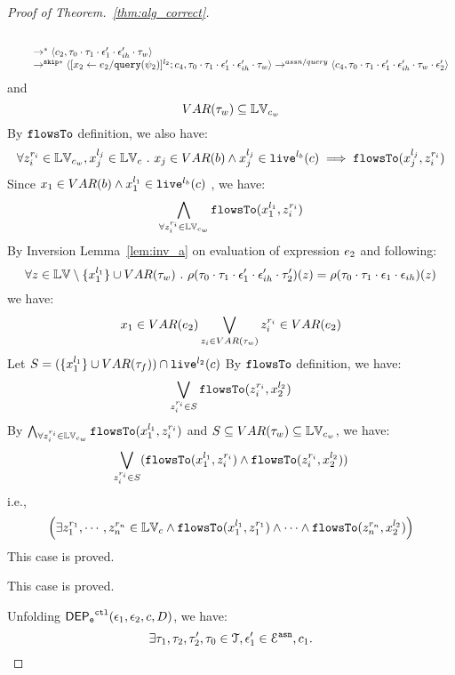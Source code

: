 \begin{proof}[Proof of Theorem.~\ref{thm:alg_correct}]
\begin{case}
\begin{subcase}
\begin{subsubcase}
\begin{subsubsubcase}
\begin{subproof}
\begin{enumerate}
\[\begin{array}{l}
  \\
  \qquad \rightarrow^{*} 
  \langle c_2,\mathtt{\tau}_0 \cdot \mathtt{\tau}_1 \cdot \mathtt{\epsilon}_1' \cdot \mathtt{\epsilon}_{ih}' \cdot \mathtt{\tau}_w \rangle
  \\
  \qquad \rightarrow^{\mathtt{skip}*} 
  \langle [\mathrel{ {x}_2 \leftarrow e_2 / {\tt query}(\psi_2) }]^{l_2};{c}_4, 
  \mathtt{\tau}_0 \cdot \mathtt{\tau}_1 \cdot \mathtt{\epsilon}_1' \cdot \mathtt{\epsilon}_{ih}' \cdot \mathtt{\tau}_w \rangle
  \rightarrow^{assn/query} 
  \langle {c}_4,  \mathtt{\tau}_0 \cdot \mathtt{\tau}_1 \cdot \mathtt{\epsilon}_1' \cdot \mathtt{\epsilon}_{ih}' \cdot \mathtt{\tau}_w \cdot \mathtt{\epsilon}_2' \rangle 
\end{array}
\]
and
\[
  VAR{(\mathtt{\tau}_w)} \subseteq \mathbb{LV}_{c_w}
\]
%
By $\mathtt{flowsTo}$ definition, we also have:
\[
  \forall z_i^{r_i} \in \mathbb{LV}_{c_w},  x_j^{l_j} \in \mathbb{LV}_c ~.~ x_j \in VAR(b) \land x_j^{l_j} \in \mathtt{live}^{l_b}(c) \implies
  \mathtt{flowsTo}(x_j^{l_j}, z_i^{r_i})
\]
Since $x_1 \in VAR(b) \land x_1^{l_1} \in \mathtt{live}^{l_b}(c)$ , we have:
\[
  \bigwedge_{\forall z_i^{r_i} \in \mathbb{LV}_{c_w}}
  \mathtt{flowsTo}(x_1^{l_1}, z_i^{r_i})
\]
%
By Inversion Lemma~\ref{lem:inv_a} on evaluation of expression $e_2$ and following: 
\[
  \forall z \in \mathbb{LV} \setminus \{x_1^{l_1}\} \cup VAR{(\mathtt{\tau}_w)} ~.~
  \rho(\mathtt{\tau}_0 \cdot \mathtt{\tau}_1 \cdot \mathtt{\epsilon}_1'\cdot \mathtt{\epsilon}_{ih}' \cdot \mathtt{\tau}_2')(z) 
  = \rho(\mathtt{\tau}_0 \cdot \mathtt{\tau}_1 \cdot \mathtt{\epsilon}_1\cdot \mathtt{\epsilon}_{ih})(z)
\]
%
we have:
\[
  x_1 \in VAR(e_2) \bigvee_{z_i \in VAR{(\mathtt{\tau}_w)}} z_i^{r_i} \in VAR(e_2)
\]
%
Let $S = (\{x_1^{l_1}\} \cup VAR{(\mathtt{\tau}_f)}) \cap \mathtt{live}^{l_2}(c) $
%
By $\mathtt{flowsTo}$ definition, we have:
\[
   \bigvee_{z_i^{r_i} \in S}  \mathtt{flowsTo}(z_i^{r_i}, x_2^{l_2})
\]
By $ \bigwedge_{\forall z_i^{r_i} \in \mathbb{LV}_{c_w}} \mathtt{flowsTo}(x_1^{l_1}, z_i^{r_i})$ and $S \subseteq VAR{(\mathtt{\tau}_w)} \subseteq \mathbb{LV}_{c_w}$, we have:
\[
\bigvee_{z_i^{r_i} \in S} 
(\mathtt{flowsTo}(x_1^{l_1}, z_i^{r_i}) \land \mathtt{flowsTo}(z_i^{r_i}, x_2^{l_2}))
\]
%
i.e.,
\[
\Big(\exists z_1^{r_1}, \cdots, z_n^{r_n} \in \mathbb{LV}_{{c}}
 \land \mathtt{flowsTo}(x_1^{l_1}, z_1^{r_1}) \land \cdots \land \mathtt{flowsTo}(z_n^{r_n}, {x}_2^{l_2}) \Big)
\]
%
This case is proved.
\end{enumerate}
\end{subproof}
%
This case is proved.
\end{subsubsubcase}
\end{subsubcase}
\end{subcase}
\end{case}
%
Unfolding $\mathsf{DEP_{\mathtt{e}}}^{\mathtt{{ctl}}}(\mathtt{\epsilon}_1, \mathtt{\epsilon}_2, c, D)$, we have:
%
\[
\exists \mathtt{\tau}_1, \mathtt{\tau}_2, \mathtt{\tau}_2', \mathtt{\tau}_0 \in \mathcal{T}, 
\mathtt{\epsilon}_1' \in \mathcal{E}^{\mathtt{{asn}}}, {c}_1.
\]
\end{proof}
